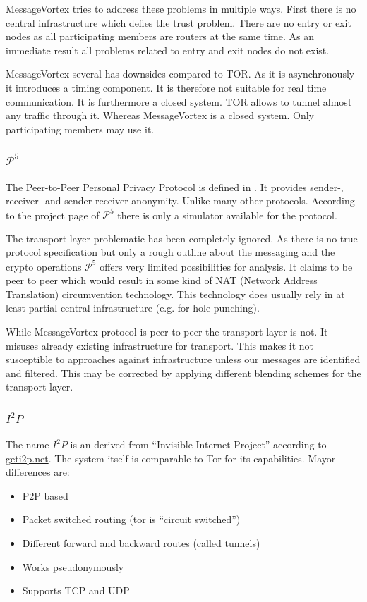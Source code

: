 \documentclass[9pt,journal,compsoc]{IEEEtran}
\begin{document}
MessageVortex tries to address these problems in multiple ways. First there is no central infrastructure which defies the trust problem. There are no entry or exit nodes as all participating members are routers at the same time. As an immediate result all problems related to entry and exit nodes do not exist. 

MessageVortex several has downsides compared to TOR. As it is asynchronously it introduces a timing component. It is therefore not suitable for real time communication. It is furthermore a closed system. TOR allows to tunnel almost any traffic through it. Whereas MessageVortex is a closed system. Only participating members may use it. 

\subsubsection{$\mathcal{P}^5$}
The Peer-to-Peer Personal Privacy Protocol is defined in \cite{sherwood-protocol}. It provides sender-, receiver- and sender-receiver anonymity. Unlike many other protocols. According to the project page of $\mathcal{P}^5$ there is only a simulator available for the protocol.

The transport layer problematic has been completely ignored. As there is no true protocol specification but only a rough outline about the messaging and the crypto operations $\mathcal{P}^5$ offers very limited possibilities for analysis. It claims to be peer to peer which would result in some kind of NAT (Network Address Translation) circumvention technology. This technology does usually rely in at least partial central infrastructure (e.g. for hole punching). 

While MessageVortex protocol is peer to peer the transport layer is not. It misuses already existing infrastructure for transport. This makes it not susceptible to approaches against infrastructure unless our messages are identified and filtered. This may be corrected by applying different blending schemes for the transport layer. 

\subsubsection{$I^2P$}
The name $I^2P$ is an derived from  ``Invisible Internet Project'' according to \href{https://geti2p.net/}{geti2p.net}. The system itself is comparable to Tor for its capabilities. Mayor differences are:
\begin{itemize}
	\item P2P based
	\item Packet switched routing (tor is ``circuit switched'')
	\item Different forward and backward routes (called tunnels)
	\item Works pseudonymously
	\item Supports TCP and UDP
\end{itemize}
\end{document}
